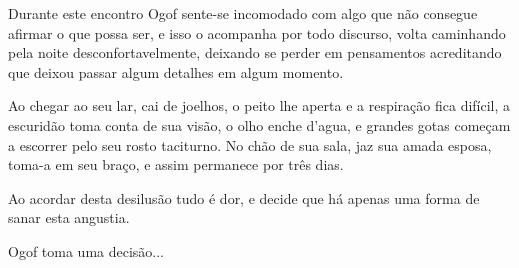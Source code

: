 Durante este encontro Ogof sente-se incomodado com algo que não consegue afirmar o que possa ser, e isso o acompanha por todo discurso, volta caminhando pela noite desconfortavelmente, deixando se perder em pensamentos acreditando que deixou passar algum detalhes em algum momento. 

Ao chegar ao seu lar, cai de joelhos, o peito lhe aperta e a respiração fica difícil, a escuridão toma conta de sua visão, o olho enche d'agua, e grandes gotas começam a escorrer pelo seu rosto taciturno. No chão de sua sala, jaz sua amada esposa, toma-a em seu braço, e assim permanece por três dias. 

Ao acordar desta desilusão tudo é dor, e decide que há apenas uma forma de sanar esta angustia.

Ogof toma uma decisão...
